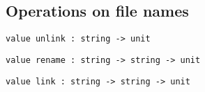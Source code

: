 \subsection*{Operations on file names }\begin{verbatim}
value unlink : string -> unit
\end{verbatim}
%
\begin{comment}
 Removes the named file 
\end{comment}
\begin{verbatim}
value rename : string -> string -> unit
\end{verbatim}
%
\begin{comment}
 \verbrename old new changes the name of a file from \verbold to \verbnew. 
\end{comment}
\begin{verbatim}
value link : string -> string -> unit
\end{verbatim}
%
\begin{comment}
 \verblink source dest creates a hard link named \verbdest to the file
           named \verbnew. 
\end{comment}
